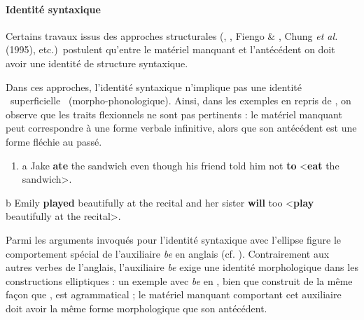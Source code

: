 \paragraph[Identité syntaxique]{Identité syntaxique}
Certains travaux issus des approches structurales (\citet{Sag1976}, \citet{Williams1977}, Fiengo \& \citet{May1994}, Chung \textit{et al.} (1995), etc.)~postulent qu'entre le matériel manquant et l'antécédent on doit avoir une identité de structure syntaxique. 

Dans ces approches, l'identité syntaxique n'implique pas une identité {\guillemotleft}~superficielle~{\guillemotright} (morpho-phonologique). Ainsi, dans les exemples en  repris de \citet{Merchant2009}, on observe que les traits flexionnels ne sont pas pertinents : le matériel manquant peut correspondre à une forme verbale infinitive, alors que son antécédent est une forme fléchie au passé.


\begin{enumerate}
\item \label{bkm:Ref306037707}a  Jake \textbf{ate} the sandwich even though his friend told him not \textbf{to} {\textless}\textbf{eat} the sandwich{\textgreater}. 


\end{enumerate}
  b  Emily \textbf{played} beautifully at the recital and her sister \textbf{will} too {\textless}\textbf{play} beautifully at the recital{\textgreater}.  

Parmi les arguments invoqués pour l'identité syntaxique avec l'ellipse figure le comportement spécial de l'auxiliaire \textit{be} en anglais (cf. \citet{Merchant2009}). Contrairement aux autres verbes de l'anglais, l'auxiliaire \textit{be} exige une identité morphologique dans les constructions elliptiques : un exemple avec \textit{be} en , bien que construit de la même façon que , est agrammatical ; le matériel manquant comportant cet auxiliaire doit avoir la même forme morphologique que son antécédent.


